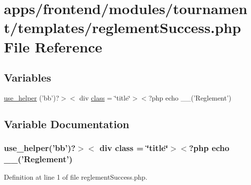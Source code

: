 \hypertarget{frontend_2modules_2tournament_2templates_2reglement_success_8php}{\section{apps/frontend/modules/tournament/templates/reglement\-Success.php File Reference}
\label{frontend_2modules_2tournament_2templates_2reglement_success_8php}
}
\subsection*{Variables}
\begin{DoxyCompactItemize}
\item 
\hyperlink{frontend_2modules_2tournament_2templates_2reglement_success_8php_ad20740d877696f45a78b0497ff807965}{use\-\_\-helper} ('bb')?$>$$<$ div \hyperlink{live_2modules_2news_2templates_2__actualitelight_8php_a185c73c6507391d1eb38c776b68ce96d}{class} = \char`\"{}title\char`\"{}$>$$<$?php echo \-\_\-\-\_\-('Reglement')
\end{DoxyCompactItemize}


\subsection{Variable Documentation}
\hypertarget{frontend_2modules_2tournament_2templates_2reglement_success_8php_ad20740d877696f45a78b0497ff807965}{
\subsubsection[{use\-\_\-helper}]{\setlength{\rightskip}{0pt plus 5cm}use\-\_\-helper('bb')?$>$$<$ div {\bf class} = \char`\"{}title\char`\"{}$>$$<$?php echo \-\_\-\-\_\-('Reglement')}}\label{frontend_2modules_2tournament_2templates_2reglement_success_8php_ad20740d877696f45a78b0497ff807965}


Definition at line 1 of file reglement\-Success.\-php.

